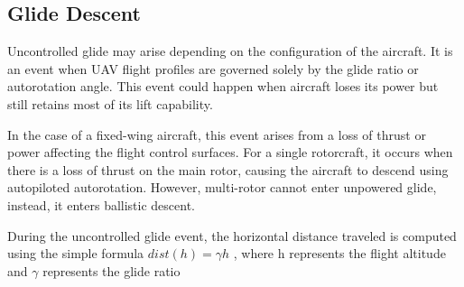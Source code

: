 \documentclass[12pt]{report}
\begin{document}
        \subsection{Glide Descent}
        Uncontrolled glide may arise depending on the configuration of the aircraft. It is an event when UAV flight
        profiles are governed solely by the glide ratio or autorotation angle. This event could happen when aircraft
        loses its power but still retains most of its lift capability.
            
        In the case of a fixed-wing aircraft, this event arises from a loss of thrust or power affecting the flight
        control surfaces. For a single rotorcraft, it occurs when there is a loss of thrust on the main rotor, causing
        the aircraft to descend using autopiloted autorotation. However, multi-rotor cannot enter unpowered glide,
        instead, it enters ballistic descent.
            
        During the uncontrolled glide event, the horizontal distance traveled is computed using the simple formula
        \(dist(h) = \gamma{h}\) , where h represents the flight altitude and \(\gamma\) represents the glide ratio
\end{document}
